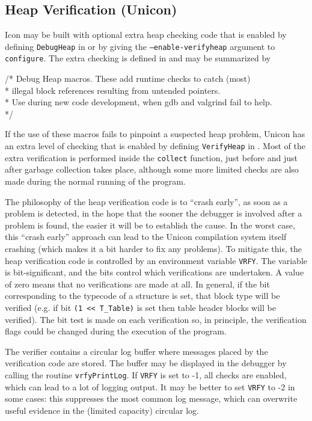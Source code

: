 \subsection{Heap Verification (Unicon)}
\label{HeapVerifier}
Icon may be built with optional extra heap checking code that is enabled by
defining \texttt{DebugHeap} in  or by giving the
\texttt{--enable-verifyheap} argument to \texttt{configure}.
The extra checking is defined in  and may be summarized by
\begin{iconcode}
/* Debug Heap macros.  These add runtime checks to catch (most)\\
 * illegal block references resulting from untended pointers.\\
 * Use during new code development, when gdb and valgrind fail to help.\\
 */
\end{iconcode}
If the use of these macros fails to pinpoint a suspected heap problem, Unicon
has an extra level of checking that is enabled by defining \texttt{VerifyHeap}
in . Most of the extra verification is performed inside
the \texttt{collect} function, just before and just after garbage collection
takes place, although some more limited checks are also made during the normal
running of the program.

The philosophy of the heap verification code is to ``crash early'', as soon as a
problem is detected, in the hope that the sooner the debugger is involved after
a problem is found, the easier it will be to establish the cause. In the worst
case, this ``crash early'' approach can lead to the Unicon compilation system
itself crashing (which makes it a bit harder to fix any problems). To mitigate
this, the heap verification code is controlled by an environment
variable \texttt{VRFY}. The variable is bit-significant, and the bits control
which verifications are undertaken. A value of zero means that no verifications
are made at all. In general, if the bit corresponding to the typecode of a
structure is set, that block type will be verified (e.g. if bit \texttt{(1 <{}<
T\_Table)} is set then table header blocks will be verified). The bit test is made
on each verification so, in principle, the verification flags could be changed
during the execution of the program.

The verifier contains a circular log buffer where messages placed by the
verification code are stored. The buffer may be displayed in the debugger by
calling the routine \texttt{vrfyPrintLog}. If \texttt{VRFY} is set to -1, all
checks are enabled, which can lead to a lot of logging output. It may be better
to set \texttt{VRFY} to -2 in some cases: this suppresses the most common log
message, which can overwrite useful evidence in the (limited capacity) circular
log.


